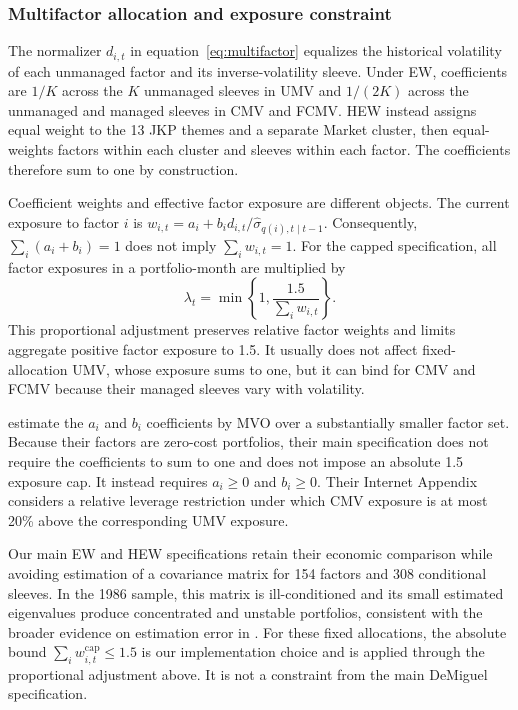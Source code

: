 \documentclass[preprint,12pt,authoryear]{elsarticle}
\begin{document}
\begin{appendices}
\subsubsection{Multifactor allocation and exposure constraint}

The normalizer $d_{i,t}$ in equation~\eqref{eq:multifactor} equalizes the historical volatility of each unmanaged factor and its inverse-volatility sleeve. Under EW, coefficients are $1/K$ across the $K$ unmanaged sleeves in UMV and $1/(2K)$ across the unmanaged and managed sleeves in CMV and FCMV. HEW instead assigns equal weight to the 13 JKP themes and a separate Market cluster, then equal-weights factors within each cluster and sleeves within each factor. The coefficients therefore sum to one by construction.

Coefficient weights and effective factor exposure are different objects. The current exposure to factor $i$ is $w_{i,t}=a_i+b_i d_{i,t}/\widehat{\sigma}_{q(i),t\mid t-1}$. Consequently, $\sum_i(a_i+b_i)=1$ does not imply $\sum_iw_{i,t}=1$. For the capped specification, all factor exposures in a portfolio-month are multiplied by
\begin{equation}
\lambda_t=\min\left\{1,\frac{1.5}{\sum_i w_{i,t}}\right\}.
\end{equation}
This proportional adjustment preserves relative factor weights and limits aggregate positive factor exposure to 1.5. It usually does not affect fixed-allocation UMV, whose exposure sums to one, but it can bind for CMV and FCMV because their managed sleeves vary with volatility.

\citet{demiguelmartinutrerauppal2024} estimate the $a_i$ and $b_i$ coefficients by MVO over a substantially smaller factor set. Because their factors are zero-cost portfolios, their main specification does not require the coefficients to sum to one and does not impose an absolute 1.5 exposure cap. It instead requires $a_i\geq0$ and $b_i\geq0$. Their Internet Appendix considers a relative leverage restriction under which CMV exposure is at most 20\% above the corresponding UMV exposure.

Our main EW and HEW specifications retain their economic comparison while avoiding estimation of a covariance matrix for 154 factors and 308 conditional sleeves. In the 1986 sample, this matrix is ill-conditioned and its small estimated eigenvalues produce concentrated and unstable portfolios, consistent with the broader evidence on estimation error in \citet{demiguelgarlappiuppal2009}. For these fixed allocations, the absolute bound $\sum_iw_{i,t}^{\mathrm{cap}}\leq1.5$ is our implementation choice and is applied through the proportional adjustment above. It is not a constraint from the main DeMiguel specification.



\end{appendices}
\end{document}
